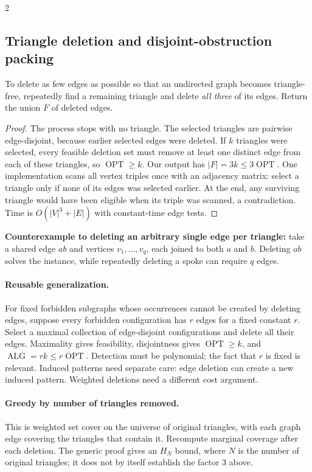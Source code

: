 \documentclass[10pt]{article}
\theoremstyle{definition}
\newcommand{\OPT}{\operatorname{OPT}}
\newcommand{\ALG}{\operatorname{ALG}}
\begin{document}
\begin{multicols*}{2}
\subsection{Triangle deletion and disjoint-obstruction packing}
\label{gre:triangles}
To delete as few edges as possible so that an undirected graph becomes triangle-free,
repeatedly find a remaining triangle and delete \emph{all three} of its edges. Return the
union $F$ of deleted edges.
\begin{proof}
The process stops with no triangle. The selected triangles are pairwise edge-disjoint,
because earlier selected edges were deleted. If $k$ triangles were selected, every feasible
deletion set must remove at least one distinct edge from each of these triangles, so
$\OPT\ge k$. Our output has $|F|=3k\le3\OPT$.
One implementation scans all vertex triples once with an adjacency matrix: select a
triangle only if none of its edges was selected earlier. At the end, any surviving triangle
would have been eligible when its triple was scanned, a contradiction. Time is
$O(|V|^3+|E|)$ with constant-time edge tests.
\end{proof}
\textbf{Counterexample to deleting an arbitrary single edge per triangle:}
take a shared edge $ab$ and vertices $v_1,\ldots,v_q$, each joined to both $a$ and $b$.
Deleting $ab$ solves the instance, while repeatedly deleting a spoke can require $q$ edges.

\paragraph{Reusable generalization.}
For fixed forbidden subgraphs whose occurrences cannot be created by deleting edges,
suppose every forbidden configuration has $r$ edges for a fixed constant $r$. Select a maximal
collection of edge-disjoint configurations and delete all their edges. Maximality gives
feasibility, disjointness gives $\OPT\ge k$, and $\ALG=rk\le r\OPT$. Detection must be
polynomial; the fact that $r$ is fixed is relevant. Induced patterns need separate care:
edge deletion can create a new induced pattern. Weighted deletions need a different cost argument.

\paragraph{Greedy by number of triangles removed.}
This is weighted set cover on the universe of original triangles, with each graph edge
covering the triangles that contain it. Recompute marginal coverage after each deletion.
The generic proof gives an $H_N$ bound, where $N$ is the number of original triangles;
it does not by itself establish the factor 3 above.



\end{multicols*}
\end{document}
